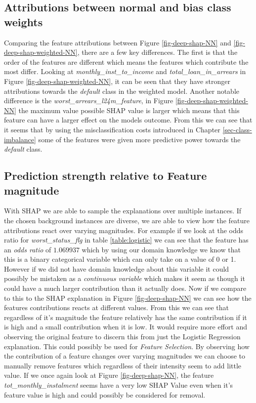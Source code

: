 \subsection{Attributions between normal and bias class weights}
Comparing the feature attributions between Figure \ref{fig-deep-shap-NN} and \ref{fig-deep-shap-weighted-NN}, there are a few key differences. The first is that the order of the features are different which means the features which contribute the most differ. Looking at \emph{monthly\_inst\_to\_income} and \emph{total\_loan\_in\_arrears} in Figure  \ref{fig-deep-shap-weighted-NN}, it can be seen that they have stronger attributions towards the \emph{default} class in the weighted model. Another notable difference is the \emph{worst\_arrears\_l24m\_feature}, in Figure \ref{fig-deep-shap-weighted-NN} the maximum value possible SHAP value is larger which means that this feature can have a larger effect on the models outcome. From this we can see that it seems that by using the misclassification costs introduced in Chapter \ref{sec-class-imbalance} some of the features were given more predictive power towards the \emph{default} class.

\subsection{Prediction strength relative to Feature magnitude} \label{sect-prediction-strength}
With SHAP we are able to sample the explanations over multiple instances. If the chosen background instances are diverse, we are able to view how the feature attributions react over varying magnitudes. For example if we look at the odds ratio for \emph{worst\_status\_flg} in table \ref{table:logistic} we can see that the feature has an \emph{odds ratio} of $1.069937$ which by using our domain knowledge we know that this is a binary categorical variable which can only take on a value of 0 or 1. However if we did not have domain knowledge about this variable it could possibly be mistaken as a \emph{continuous variable} which makes it seem as though it could have a much larger contribution than it actually does. Now if we compare to this to the SHAP explanation in Figure \ref{fig-deep-shap-NN} we can see how the features contributions reacts at different values. From this we can see that regardless of it's magnitude the feature relatively has the same contribution if it is high and a small contribution when it is low. It would require more effort and observing the original feature to discern this from just the Logistic Regression explanation. This could possibly be used for \emph{Feature Selection}. By observing how the contribution of a feature changes over varying magnitudes we can choose to manually remove features which regardless of their intensity seem to add little value. If we once again look at Figure \ref{fig-deep-shap-NN}, the feature \emph{tot\_monthly\_instalment} seems have a very low SHAP Value even when it's feature value is high and could possibly be considered for removal. 